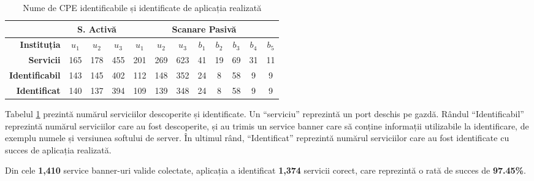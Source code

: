 	\begin{table}[H]
		\centering
		\begin{tabular}{r|ccc|ccc|ccccc|}
			\cline{2-12}
			\multicolumn{1}{l|}{}                         & \multicolumn{3}{c|}{\textbf{S. Activă}} & \multicolumn{8}{c|}{\textbf{Scanare Pasivă}}                                                             \\ \hline
			\multicolumn{1}{|r|}{\textbf{Instituția}}      & \textbf{$u_1$}    & \textbf{$u_2$}    & \textbf{$u_3$}   & \textbf{$u_1$} & \textbf{$u_2$} & \textbf{$u_3$} & \textbf{$b_1$} & \textbf{$b_2$} & \textbf{$b_3$} & \textbf{$b_4$} & \textbf{$b_5$} \\ \hline
			\multicolumn{1}{|r|}{\textbf{Servicii}} & 165            & 178            & 455           & 201         & 269         & 623         & 41          & 19          & 69          & 31          & 11          \\
			\multicolumn{1}{|r|}{\textbf{Identificabil}} & 143            & 145            & 402           & 112         & 148         & 352         & 24          & 8           & 58          & 9           & 9           \\
			\multicolumn{1}{|r|}{\textbf{Identificat}}   & 140            & 137            & 394           & 109         & 139         & 348         & 24          & 8           & 58          & 9           & 9           \\ \hline
		\end{tabular}
		\caption{Nume de CPE identificabile și identificate de aplicația realizată}
		\label{cpeids_ro}
	\end{table}
	
	Tabelul \ref{cpeids_ro} prezintă numărul serviciilor descoperite și identificate. Un ``serviciu'' reprezintă un port deschis pe gazdă. Rândul ``Identificabil'' reprezintă numărul serviciilor care au fost descoperite, și au trimis un service banner care să conține informații utilizabile la identificare, de exemplu numele și versiunea softului de server. În ultimul rând, ``Identificat'' reprezintă numărul serviciilor care au fost identificate cu succes de aplicația realizată.
	
	Din cele \textbf{1,410} service banner-uri valide colectate, aplicația a identificat \textbf{1,374} servicii corect, care reprezintă o rată de succes de \textbf{97.45\%}.
	
